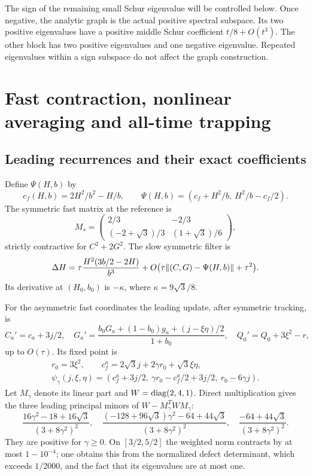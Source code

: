 \documentclass[11pt]{article}
\theoremstyle{remark}\newtheorem{remark}[theorem]{Remark}
\numberwithin{equation}{section}
\begin{document}
The sign of the remaining small Schur eigenvalue will be controlled below. Once negative, the analytic graph is the actual positive spectral subspace. Its two positive eigenvalues have a positive middle Schur coefficient $t/8+O(t^3)$. The other block has two positive eigenvalues and one negative eigenvalue. Repeated eigenvalues within a sign subspace do not affect the graph construction.

\section{Fast contraction, nonlinear averaging and all-time trapping}
\subsection{Leading recurrences and their exact coefficients}
Define $\Psi(H,b)$ by
\[
 c_f(H,b)=2H^2/b^2-H/b,\qquad
 \Psi(H,b)=(c_f+H^2/b,\ H^2/b-c_f/2).
\]
The symmetric fast matrix at the reference is
\[
 M_s=\begin{pmatrix}2/3&-2/3\\(-2+\sqrt3)/3&(1+\sqrt3)/6\end{pmatrix},
\]
strictly contractive for $C^2+2G^2$. The slow symmetric filter is
\[
 \Delta H=\tau\frac{H^2(3b/2-2H)}{b^3}
 +O\bigl(\tau\lVert (C,G)-\Psi(H,b)\rVert+\tau^2\bigr).
\]
Its derivative at $(H_0,b_0)$ is $-\kappa$, where $\kappa=9\sqrt3/8$.

For the asymmetric fast coordinates the leading update, after symmetric tracking, is
\begin{equation}\label{eq:fast}
 C_a'=c_a+3j/2,\quad
 G_a'=\frac{b_0G_a+(1-b_0)g_a+(j-\xi\eta)/2}{1+b_0},\quad
 Q_0'=Q_0+3\xi^2-r,
\end{equation}
up to $O(\tau)$. Its fixed point is
\begin{equation}\label{eq:psia}
 \begin{gathered}
 r_0=3\xi^2,\qquad c_f^a=2\sqrt3j+2\gamma r_0+\sqrt3\xi\eta,\\
 \psi_\gamma(j,\xi,\eta)=
 (c_f^a+3j/2,\ \gamma r_0-c_f^a/2+3j/2,\ r_0-6\gamma j).
 \end{gathered}
\end{equation}
Let $M_\gamma$ denote its linear part and $W=\operatorname{diag}(2,4,1)$. Direct multiplication gives the three leading principal minors of $W-M_\gamma^TWM_\gamma$:
\begin{equation}\label{eq:minors}
 \frac{16\gamma^2-18+16\sqrt3}{(3+8\gamma^2)^2},\quad
 \frac{(-128+96\sqrt3)\gamma^2-64+44\sqrt3}{(3+8\gamma^2)^2},\quad
 \frac{-64+44\sqrt3}{(3+8\gamma^2)^2}.
\end{equation}
They are positive for $\gamma\geq0$. On $[3/2,5/2]$ the weighted norm contracts by at most $1-10^{-4}$; one obtains this from the normalized defect determinant, which exceeds $1/2000$, and the fact that its eigenvalues are at most one.
\end{document}

